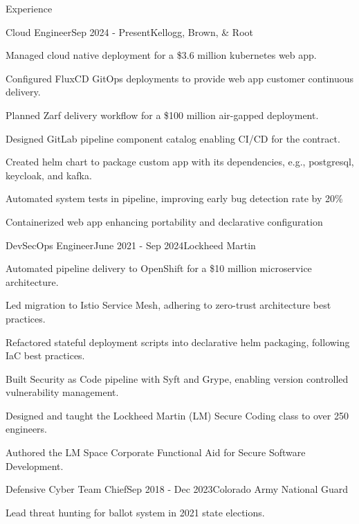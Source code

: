 \documentclass[
	a4paper, %
	11pt, %
]{resume} %
\begin{document}
\begin{rSection}{Experience}

	\begin{rSubsection}{Cloud Engineer}{Sep 2024 - Present}{Kellogg, Brown, \& Root}
		\item Managed cloud native deployment for a \$3.6 million kubernetes web app.
		\item Configured FluxCD GitOps deployments to provide web app customer continuous delivery.
		\item Planned Zarf delivery workflow for a \$100 million air-gapped deployment.
		\item Designed GitLab pipeline component catalog enabling CI/CD for the contract.
		\item Created helm chart to package custom app with its dependencies, e.g., postgresql, keycloak, and kafka.
		\item Automated system tests in pipeline, improving early bug detection rate by 20\%
		\item Containerized web app enhancing portability and declarative configuration
	\end{rSubsection}
	\begin{rSubsection}{DevSecOps Engineer}{June 2021 - Sep 2024}{Lockheed Martin}
		\item Automated pipeline delivery to OpenShift for a \$10 million microservice architecture.
		\item Led migration to Istio Service Mesh, adhering to zero-trust architecture best practices.
		\item Refactored stateful deployment scripts into declarative helm packaging, following IaC best practices.
		\item Built Security as Code pipeline with Syft and Grype, enabling version controlled vulnerability management.
		\item Designed and taught the Lockheed Martin (LM) Secure Coding class to over 250 engineers.
		\item Authored the LM Space Corporate Functional Aid for Secure Software Development.
	\end{rSubsection}
	\begin{rSubsection}{Defensive Cyber Team Chief}{Sep 2018 - Dec 2023}{Colorado Army National Guard}
		\item Lead threat hunting for ballot system in 2021 state elections.

\end{rSubsection}
\end{rSection}
\end{document}
